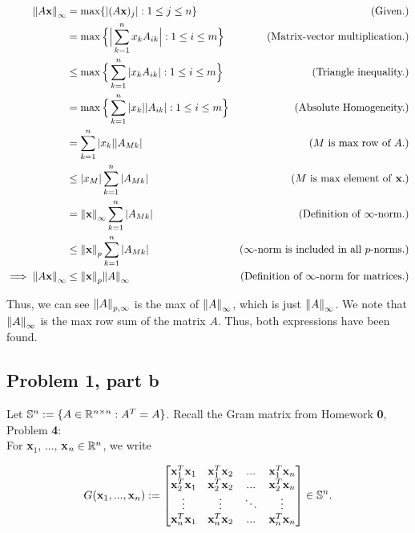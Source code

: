 \begin{solution}
    \alignbreak
    \begin{align}
        \norm{A\textbf{x}}_\infty &= \max \{ |(A\textbf{x})_j | : 1 \leq j \leq n\} &\text{(Given.)}\nonumber\\
        &= \max \Big\{ \Big|\sum_{k = 1}^nx_kA_{ik}\Big| : 1 \leq i \leq m\Big\} &\text{(Matrix-vector multiplication.)}\nonumber\\
        &\leq \max \Big\{ \sum_{k = 1}^n|x_kA_{ik}| : 1 \leq i \leq m\Big\} &\text{(Triangle inequality.)}\nonumber\\
        &= \max \Big\{ \sum_{k = 1}^n|x_k||A_{ik}| : 1 \leq i \leq m\Big\} &\text{(Absolute Homogeneity.)}\nonumber\\
        &= \sum_{k = 1}^n|x_k||A_{Mk}| &\text{($M$ is max row of $A$.)}\nonumber\\
        &\leq |x_M|\sum_{k = 1}^n|A_{Mk}| &\text{($M$ is max element of \textbf{x}.)}\nonumber\\
        &= \norm{\textbf{x}}_\infty\sum_{k = 1}^n|A_{Mk}| &\text{(Definition of $\infty$-norm.)}\nonumber\\
        &\leq \norm{\textbf{x}}_p\sum_{k = 1}^n|A_{Mk}| &\text{($\infty$-norm is included in all $p$-norms.)}\nonumber\\
        \implies \norm{A\textbf{x}}_\infty &\leq \norm{\textbf{x}}_p\norm{A}_\infty &\text{(Definition of $\infty$-norm for matrices.)}\nonumber
    \end{align}
    \alignbreak

    Thus, we can see $\norm{A}_{p,\infty}$ is the max of $\norm{A}_\infty$, which is just $\norm{A}_\infty$. We note that $\norm{A}_\infty$ is the max row sum of the matrix $A$. Thus, both expressions have been found.
\end{solution}

\newpage
\subsection{Problem 1, part b}
Let $\S^n := \{ A \in \R^{n\times n} : A^T = A \}$. Recall the Gram matrix from Homework \textbf{0}, Problem \textbf{4}:
\\
For \textbf{x}$_1$, ..., \textbf{x}$_n \in \R^n$, we write

\[
G(\textbf{x}_1, ...,\textbf{x}_n) := 
\begin{bmatrix}
    \textbf{x}_1^T\textbf{x}_1 &\textbf{x}_1^T\textbf{x}_2 &... &\textbf{x}_1^T\textbf{x}_n\\
    \textbf{x}_2^T\textbf{x}_1 &\textbf{x}_2^T\textbf{x}_2 &... &\textbf{x}_2^T\textbf{x}_n\\
    \vdots    &\vdots     &\ddots    &\vdots\\
    \textbf{x}_n^T\textbf{x}_1 &\textbf{x}_n^T\textbf{x}_2 &... &\textbf{x}_n^T\textbf{x}_n\\
\end{bmatrix}
\in \S^n.
\]

